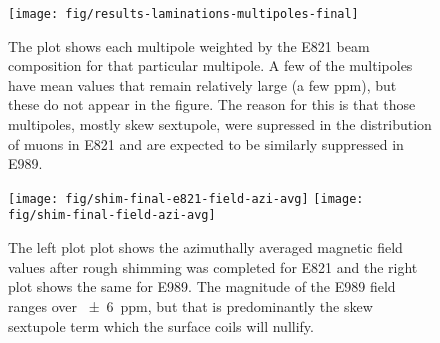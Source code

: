 \begin{figure}
\centering
\texttt{[image: fig/results-laminations-multipoles-final]}
\caption{The plot shows each multipole weighted by the E821 beam composition for that particular multipole.  A few of the multipoles have mean values that remain relatively large (a few ppm), but these do not appear in the figure.  The reason for this is that those multipoles, mostly skew sextupole, were supressed in the distribution of muons in E821 and are expected to be similarly suppressed in E989. \label{fig:results-laminations-multipoles-final}}
\end{figure}

\begin{figure}
\centering
\texttt{[image: fig/shim-final-e821-field-azi-avg]}
\texttt{[image: fig/shim-final-field-azi-avg]}
\caption{
    The left plot plot shows the azimuthally averaged magnetic field values after rough shimming was completed for E821 and the right plot shows the same for E989.  The magnitude of the E989 field ranges over \SI{\pm 6}{ppm}, but that is predominantly the skew sextupole term which the surface coils will nullify.
    \label{fig/shim-field-final-azi-avg}
}
\end{figure}